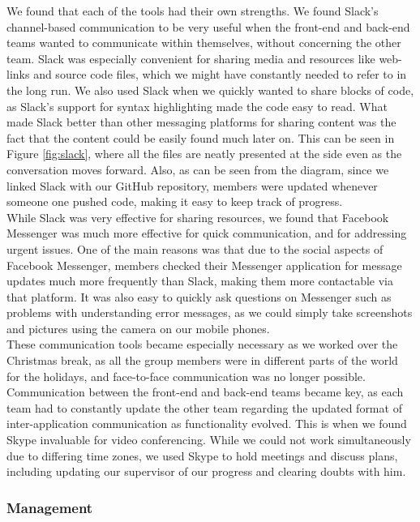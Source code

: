 \documentclass[titlepage,11pt]{article}
\begin{document}
We found that each of the tools had their own strengths. We found Slack's channel-based communication to be very useful when the front-end and back-end teams wanted to communicate within themselves, without concerning the other team. Slack was especially convenient for sharing media and resources like web-links and source code files, which we might have constantly needed to refer to in the long run. We also used Slack when we quickly wanted to share blocks of code, as Slack's support for syntax highlighting made the code easy to read. What made Slack better than other messaging platforms for sharing content was the fact that the content could be easily found much later on. This can be seen in Figure \ref{fig:slack}, where all the files are neatly presented at the side even as the conversation moves forward. Also, as can be seen from the diagram, since we linked Slack with our GitHub repository, members were updated whenever someone one pushed code, making it easy to keep track of progress. \\

While Slack was very effective for sharing resources, we found that Facebook Messenger was much more effective for quick communication, and for addressing urgent issues. One of the main reasons was that due to the social aspects of Facebook Messenger, members checked their Messenger application for message updates much more frequently than Slack, making them more contactable via that platform. It was also easy to quickly ask questions on Messenger such as problems with understanding error messages, as we could simply take screenshots and pictures using the camera on our mobile phones. \\

These communication tools became especially necessary as we worked over the Christmas break, as all the group members were in different parts of the world for the holidays, and face-to-face communication was no longer possible. Communication between the front-end and back-end teams became key, as each team had to constantly update the other team regarding the updated format of inter-application communication as functionality evolved. This is when we found Skype invaluable for video conferencing. While we could not work simultaneously due to differing time zones, we used Skype to hold meetings and discuss plans, including updating our supervisor of our progress and clearing doubts with him.

\subsubsection{Management}
\end{document}
